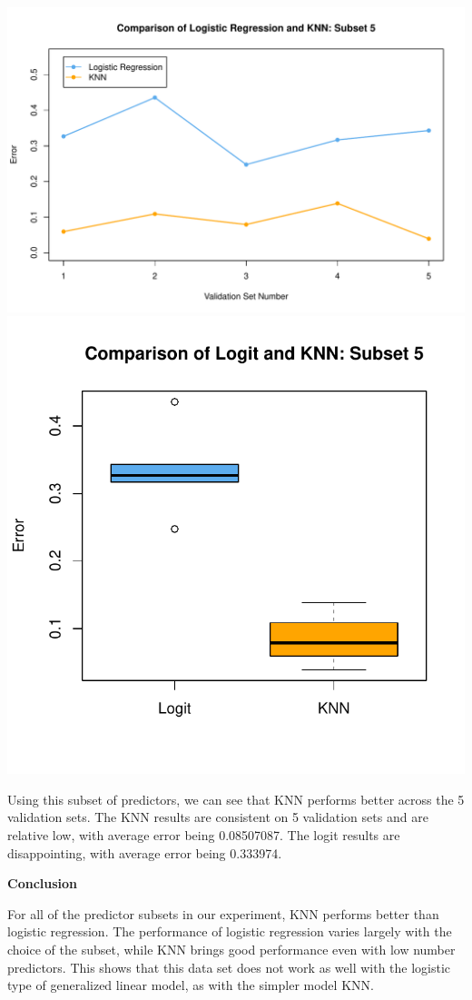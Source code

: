 \documentclass{article}
\begin{document}
\begin{center}
    \includegraphics[width=0.8\linewidth]{Images/Prob5/Prob5-13-Plot-Subset5.pdf}
    \includegraphics[width=0.45\linewidth]{Images/Prob5/Prob5-13-Boxplot-Subset5.pdf}
\end{center}

Using this subset of predictors, we can see that KNN performs better across the 5 validation sets. 
The KNN results are consistent on 5 validation sets and are relative low, with average error being 0.08507087.
The logit results are disappointing, with average error being 0.333974.
\bigskip\bigskip


\noindent\textbf{Conclusion}
\medskip

For all of the predictor subsets in our experiment, KNN performs better than logistic regression. 
The performance of logistic regression varies largely with the choice of the subset, while KNN brings good performance even with low number predictors.
This shows that this data set does not work as well with the logistic type of generalized linear model, as with the simpler model KNN. 
\end{document}
